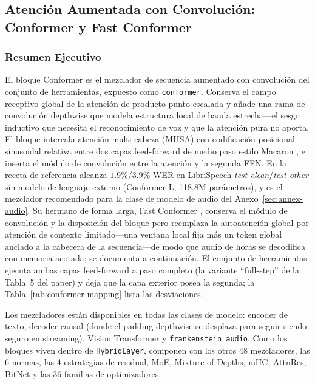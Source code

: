 \subsection{Atención Aumentada con Convolución: Conformer y Fast Conformer}
\label{sec:annex-conformer}

\subsubsection{Resumen Ejecutivo}

El bloque Conformer \citep{Gulati2020} es el mezclador de secuencia aumentado con convolución del conjunto de herramientas, expuesto como \texttt{conformer}. Conserva el campo receptivo global de la atención de producto punto escalada y añade una rama de convolución depthwise que modela estructura local de banda estrecha---el sesgo inductivo que necesita el reconocimiento de voz y que la atención pura no aporta. El bloque intercala atención multi-cabeza (MHSA) con codificación posicional sinusoidal relativa entre dos capas feed-forward de medio paso estilo Macaron \citep{Lu2019}, e inserta el módulo de convolución entre la atención y la segunda FFN. En la receta de referencia alcanza $1.9\%$/$3.9\%$ WER en LibriSpeech \emph{test-clean}/\emph{test-other} sin modelo de lenguaje externo (Conformer-L, 118.8M parámetros), y es el mezclador recomendado para la clase de modelo de audio del Anexo~\ref{sec:annex-audio}. Su hermano de forma larga, Fast Conformer \citep{rekesh_fastconformer_2023}, conserva el módulo de convolución y la disposición del bloque pero reemplaza la autoatención global por atención de contexto limitado---una ventana local fija más un token global anclado a la cabecera de la secuencia---de modo que audio de horas se decodifica con memoria acotada; se documenta a continuación. El conjunto de herramientas ejecuta ambas capas feed-forward a paso completo (la variante ``full-step'' de la Tabla~5 del paper) y deja que la capa exterior posea la segunda; la Tabla~\ref{tab:conformer-mapping} lista las desviaciones.

Los mezcladores están disponibles en todas las clases de modelo: encoder de texto, decoder causal (donde el padding depthwise se desplaza para seguir siendo seguro en streaming), Vision Transformer y \texttt{frankenstein\_audio}. Como los bloques viven dentro de \texttt{HybridLayer}, componen con los otros 48 mezcladores, las 6 normas, las 4 estrategias de residual, MoE, Mixture-of-Depths, mHC, AttnRes, BitNet y las 36 familias de optimizadores.

